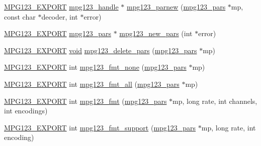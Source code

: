 \begin{DoxyCompactItemize}
\item 
\mbox{\hyperlink{mpg123_8h_a2ba98cfba3f760879df70e755b2a61cc}{M\+P\+G123\+\_\+\+E\+X\+P\+O\+RT}} \mbox{\hyperlink{group__mpg123__init_ga6728e2839a395f3a07d4514da659faca}{mpg123\+\_\+handle}} $\ast$ \mbox{\hyperlink{group__mpg123__advpar_gad06a0834157dca25dbcf4775b29a894b}{mpg123\+\_\+parnew}} (\mbox{\hyperlink{group__mpg123__advpar_ga3983578625af3bb6dc7e3b74d0cab4aa}{mpg123\+\_\+pars}} $\ast$mp, const char $\ast$decoder, int $\ast$error)
\item 
\mbox{\hyperlink{mpg123_8h_a2ba98cfba3f760879df70e755b2a61cc}{M\+P\+G123\+\_\+\+E\+X\+P\+O\+RT}} \mbox{\hyperlink{group__mpg123__advpar_ga3983578625af3bb6dc7e3b74d0cab4aa}{mpg123\+\_\+pars}} $\ast$ \mbox{\hyperlink{group__mpg123__advpar_gae40d23747eb55f0ab2612588935d6350}{mpg123\+\_\+new\+\_\+pars}} (int $\ast$error)
\item 
\mbox{\hyperlink{mpg123_8h_a2ba98cfba3f760879df70e755b2a61cc}{M\+P\+G123\+\_\+\+E\+X\+P\+O\+RT}} \mbox{\hyperlink{_s_d_l__opengles2__gl2ext_8h_ae5d8fa23ad07c48bb609509eae494c95}{void}} \mbox{\hyperlink{group__mpg123__advpar_gaafc74d249a5a7a545cc6e11576ec5c78}{mpg123\+\_\+delete\+\_\+pars}} (\mbox{\hyperlink{group__mpg123__advpar_ga3983578625af3bb6dc7e3b74d0cab4aa}{mpg123\+\_\+pars}} $\ast$mp)
\item 
\mbox{\hyperlink{mpg123_8h_a2ba98cfba3f760879df70e755b2a61cc}{M\+P\+G123\+\_\+\+E\+X\+P\+O\+RT}} int \mbox{\hyperlink{group__mpg123__advpar_gaf018c28ca2ddcfba5ef7842252ff945a}{mpg123\+\_\+fmt\+\_\+none}} (\mbox{\hyperlink{group__mpg123__advpar_ga3983578625af3bb6dc7e3b74d0cab4aa}{mpg123\+\_\+pars}} $\ast$mp)
\item 
\mbox{\hyperlink{mpg123_8h_a2ba98cfba3f760879df70e755b2a61cc}{M\+P\+G123\+\_\+\+E\+X\+P\+O\+RT}} int \mbox{\hyperlink{group__mpg123__advpar_gae473a32f2aec9d786cd3ae8857d211b1}{mpg123\+\_\+fmt\+\_\+all}} (\mbox{\hyperlink{group__mpg123__advpar_ga3983578625af3bb6dc7e3b74d0cab4aa}{mpg123\+\_\+pars}} $\ast$mp)
\item 
\mbox{\hyperlink{mpg123_8h_a2ba98cfba3f760879df70e755b2a61cc}{M\+P\+G123\+\_\+\+E\+X\+P\+O\+RT}} int \mbox{\hyperlink{group__mpg123__advpar_ga481219fd8962c7b7ab69d4c8daebc094}{mpg123\+\_\+fmt}} (\mbox{\hyperlink{group__mpg123__advpar_ga3983578625af3bb6dc7e3b74d0cab4aa}{mpg123\+\_\+pars}} $\ast$mp, long rate, int channels, int encodings)
\item 
\mbox{\hyperlink{mpg123_8h_a2ba98cfba3f760879df70e755b2a61cc}{M\+P\+G123\+\_\+\+E\+X\+P\+O\+RT}} int \mbox{\hyperlink{group__mpg123__advpar_gaa9a70e142d765916977be699c82bc603}{mpg123\+\_\+fmt\+\_\+support}} (\mbox{\hyperlink{group__mpg123__advpar_ga3983578625af3bb6dc7e3b74d0cab4aa}{mpg123\+\_\+pars}} $\ast$mp, long rate, int encoding)

\end{DoxyCompactItemize}
